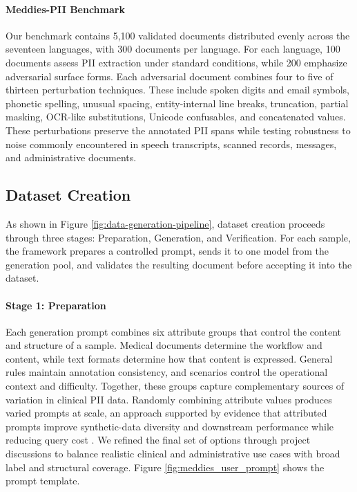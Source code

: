 \documentclass[11pt]{article}
\begin{document}
\paragraph{Meddies-PII Benchmark} Our benchmark contains 5,100 validated documents distributed evenly across the seventeen languages, with 300 documents per language. For each language, 100 documents assess PII extraction under standard conditions, while 200 emphasize adversarial surface forms. Each adversarial document combines four to five of thirteen perturbation techniques. These include spoken digits and email symbols, phonetic spelling, unusual spacing, entity-internal line breaks, truncation, partial masking, OCR-like substitutions, Unicode confusables, and concatenated values. These perturbations preserve the annotated PII spans while testing robustness to noise commonly encountered in speech transcripts, scanned records, messages, and administrative documents.

\subsection{Dataset Creation}

As shown in Figure \ref{fig:data-generation-pipeline}, dataset creation proceeds through three stages: Preparation, Generation, and Verification. For each sample, the framework prepares a controlled prompt, sends it to one model from the generation pool, and validates the resulting document before accepting it into the dataset.

\paragraph{Stage 1: Preparation} Each generation prompt combines six attribute groups that control the content and structure of a sample. Medical documents determine the workflow and content, while text formats determine how that content is expressed. General rules maintain annotation consistency, and scenarios control the operational context and difficulty. Together, these groups capture complementary sources of variation in clinical PII data. Randomly combining attribute values produces varied prompts at scale, an approach supported by evidence that attributed prompts improve synthetic-data diversity and downstream performance while reducing query cost \cite{yu2023large}. We refined the final set of options through project discussions to balance realistic clinical and administrative use cases with broad label and structural coverage. Figure \ref{fig:meddies_user_prompt} shows the prompt template.
\end{document}
